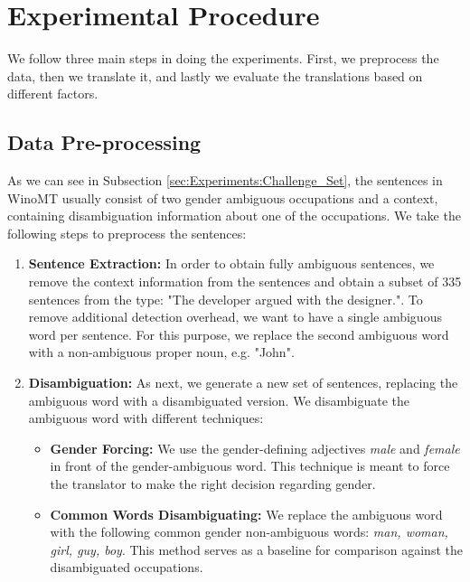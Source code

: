 
\section{Experimental Procedure}
\label{sec:Experiments:Procedure}

We follow three main steps in doing the experiments. First, we preprocess the data, then we translate it, and lastly we evaluate the translations based on different factors.

\subsection{Data Pre-processing}

As we can see in Subsection \ref{sec:Experiments:Challenge_Set}, the sentences in WinoMT usually consist of two gender ambiguous occupations and a context, containing disambiguation information about one of the occupations. We take the following steps to preprocess the sentences:

\begin{enumerate}
  \item \textbf{Sentence Extraction:}  
  In order to obtain fully ambiguous sentences, we remove the context information from the sentences and obtain a subset of 335 sentences from the type: "The developer argued with the designer.".
  To remove additional detection overhead, we want to have a single ambiguous word per sentence. For this purpose, we replace the second ambiguous word with a non-ambiguous proper noun, e.g. "John". 
  \item \textbf{Disambiguation:} 
  As next, we generate a new set of sentences, replacing the ambiguous word with a disambiguated version. We disambiguate the ambiguous word with different techniques:
  \begin{itemize}
      \item \textbf{Gender Forcing:} We use the gender-defining adjectives \textit{male} and \textit{female} in front of the gender-ambiguous word. This technique is meant to force the translator to make the right decision regarding gender.
      \item \textbf{Common Words Disambiguating:} We replace the ambiguous word with the following common gender non-ambiguous words: \textit{man, woman, girl, guy, boy}. This method serves as a baseline for comparison against the disambiguated occupations.
  \end{itemize}
\end{enumerate}

